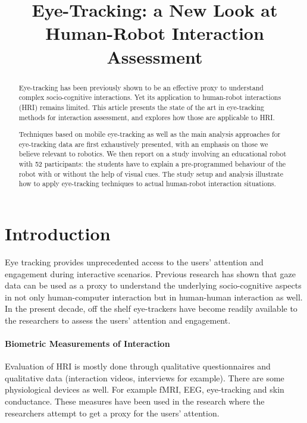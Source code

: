 \documentclass{sig-alternate}
\title{\LARGE \bf
    Eye-Tracking: a New Look at Human-Robot Interaction Assessment
}
\begin{document}
\maketitle
\begin{abstract}


Eye-tracking has been previously shown to be an effective proxy to understand
complex socio-cognitive interactions. Yet its application to human-robot
interactions (HRI) remains limited. This article presents the state of the
art in eye-tracking methods for interaction assessment, and explores how those
are applicable to HRI.

Techniques based on mobile eye-tracking as well as the main analysis approaches
for eye-tracking data are first exhaustively presented, with an emphasis on
those we believe relevant to robotics. We then report on a study involving an
educational robot with 52 participants: the
students have to explain a pre-programmed behaviour of the robot with or without
the help of visual cues. The study setup and analysis illustrate how to apply
eye-tracking techniques to actual human-robot interaction situations.

\end{abstract}
\section{Introduction}

Eye tracking provides unprecedented access to the users' attention and
engagement during interactive scenarios. Previous research
\cite{hasse2012measure,tien2010measuring,jermann2010using,sharma2012gaze} has
shown that gaze data can be used as a proxy to understand the underlying
socio-cognitive aspects in not only human-computer interaction but in
human-human interaction as well. In the present decade, off the shelf
eye-trackers have become readily available to the researchers to assess the
users' attention and engagement.



\paragraph{Biometric Measurements of Interaction}

Evaluation of HRI is mostly done through qualitative questionnaires and
qualitative data (interaction videos, interviews for example). There are some physiological devices as well. For example fMRI, EEG, eye-tracking and skin conductance. These measures have been used in the research where the researchers attempt to get a proxy for the users' attention.
\end{document}
